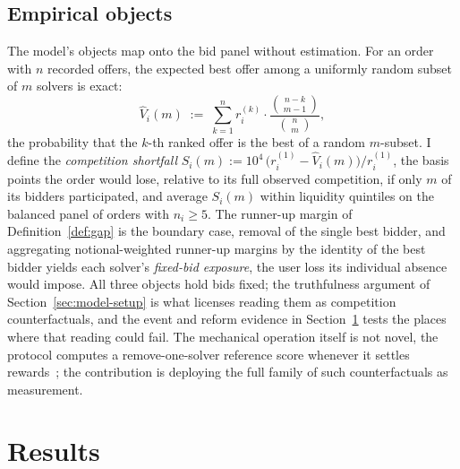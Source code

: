 \documentclass[11pt]{article}
\theoremstyle{plain}
\theoremstyle{definition}
\theoremstyle{remark}
\begin{document}
\subsection{Empirical objects}\label{sec:model-objects}
The model's objects map onto the bid panel without estimation. For an order with $n$ recorded offers, the expected best offer among a uniformly random subset of $m$ solvers is exact:
\begin{equation}\label{eq:subset}
\widehat V_i(m) \;:=\; \sum_{k=1}^{n} r_i^{(k)} \cdot \frac{\binom{n-k}{\,m-1\,}}{\binom{n}{\,m\,}},
\end{equation}
the probability that the $k$-th ranked offer is the best of a random $m$-subset. I define the \emph{competition shortfall} $S_i(m) := 10^4 \,\big(r_i^{(1)} - \widehat V_i(m)\big)/r_i^{(1)}$, the basis points the order would lose, relative to its full observed competition, if only $m$ of its bidders participated, and average $S_i(m)$ within liquidity quintiles on the balanced panel of orders with $n_i \ge 5$. The runner-up margin of Definition~\ref{def:gap} is the boundary case, removal of the single best bidder, and aggregating notional-weighted runner-up margins by the identity of the best bidder yields each solver's \emph{fixed-bid exposure}, the user loss its individual absence would impose. All three objects hold bids fixed; the truthfulness argument of Section~\ref{sec:model-setup} is what licenses reading them as competition counterfactuals, and the event and reform evidence in Section~\ref{sec:results} tests the places where that reading could fail. The mechanical operation itself is not novel, the protocol computes a remove-one-solver reference score whenever it settles rewards~\citep{cowdao_rewards}; the contribution is deploying the full family of such counterfactuals as measurement.

\section{Results}\label{sec:results}
\end{document}
